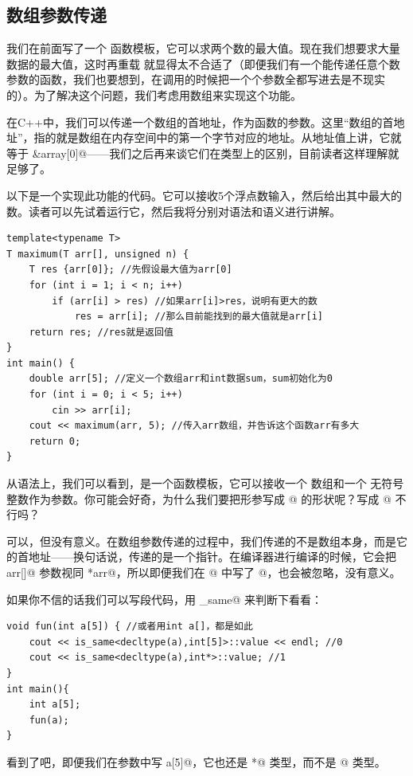 \subsection*{数组参数传递}
我们在前面写了一个 \lstinline@maximum@ 函数模板，它可以求两个数的最大值。现在我们想要求大量数据的最大值，这时再重载 \lstinline@maximum@ 就显得太不合适了（即便我们有一个能传递任意个数参数的函数，我们也要想到，在调用的时候把一个个参数全都写进去是不现实的）。为了解决这个问题，我们考虑用数组来实现这个功能。\par
在C++中，我们可以传递一个数组的首地址，作为函数的参数。这里``数组的首地址''，指的就是数组在内存空间中的第一个字节对应的地址。从地址值上讲，它就等于 \lstinline@&array[0]@——我们之后再来谈它们在类型上的区别，目前读者这样理解就足够了。\par
以下是一个实现此功能的代码。它可以接收5个浮点数输入，然后给出其中最大的数。读者可以先试着运行它，然后我将分别对语法和语义进行讲解。
\begin{lstlisting}
template<typename T>
T maximum(T arr[], unsigned n) {
    T res {arr[0]}; //先假设最大值为arr[0]
    for (int i = 1; i < n; i++)
        if (arr[i] > res) //如果arr[i]>res，说明有更大的数
            res = arr[i]; //那么目前能找到的最大值就是arr[i]
    return res; //res就是返回值
}
int main() {
    double arr[5]; //定义一个数组arr和int数据sum，sum初始化为0
    for (int i = 0; i < 5; i++)
        cin >> arr[i];
    cout << maximum(arr, 5); //传入arr数组，并告诉这个函数arr有多大
    return 0;
}
\end{lstlisting}\par
从语法上，我们可以看到，\lstinline@maximum@ 是一个函数模板，它可以接收一个 \lstinline@arr@ 数组和一个 \lstinline@n@ 无符号整数作为参数。你可能会好奇，为什么我们要把形参写成 \lstinline@arr[]@ 的形状呢？写成 \lstinline@arr[5]@ 不行吗？\par
可以，但没有意义。在数组参数传递的过程中，我们传递的不是数组本身，而是它的首地址——换句话说，传递的是一个指针。在编译器进行编译的时候，它会把 \lstinline@T arr[]@ 参数视同 \lstinline@T *arr@，所以即便我们在 \lstinline@arr[]@ 中写了 @，也会被忽略，没有意义。\par
如果你不信的话我们可以写段代码，用 \lstinline@is_same@ 来判断下看看：
\begin{lstlisting}
void fun(int a[5]) { //或者用int a[]，都是如此
    cout << is_same<decltype(a),int[5]>::value << endl; //0
    cout << is_same<decltype(a),int*>::value; //1
}
int main(){
    int a[5];
    fun(a);
}
\end{lstlisting}
看到了吧，即便我们在参数中写 \lstinline@int a[5]@，它也还是 \lstinline@int*@ 类型，而不是 \lstinline@int[5]@ 类型。\par
